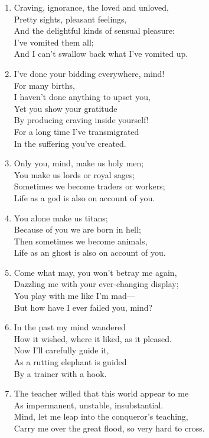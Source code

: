 \documentclass[10pt, openany]{book}
\begin{document}
\begin{enumerate}
\item Craving, ignorance, the loved and unloved,\\
Pretty sights, pleasant feelings,\\
And the delightful kinds of sensual pleasure: \\
I’ve vomited them all;\\
And I can’t swallow back what I’ve vomited up.

\item I’ve done your bidding everywhere, mind!\\
For many births, \\
I haven’t done anything to upset you,\\
Yet you show your gratitude \\
By producing craving inside yourself!\\
For a long time I’ve transmigrated \\
In the suffering you’ve created.

\item Only you, mind, make us holy men;\\
You make us lords or royal sages;\\
Sometimes we become traders or workers;\\
Life as a god is also on account of you.

\item You alone make us titans;\\
Because of you we are born in hell;\\
Then sometimes we become animals,\\
Life as an ghost is also on account of you.

\item Come what may, you won’t betray me again,\\
Dazzling me with your ever-changing display;\\
You play with me like I’m mad—\\
But how have I ever failed you, mind?

\item In the past my mind wandered\\
How it wished, where it liked, as it pleased.\\
Now I’ll carefully guide it,\\
As a rutting elephant is guided \\
By a trainer with a hook.

\item The teacher willed that this world appear to me\\
As impermanent, unstable, insubstantial.\\
Mind, let me leap into the conqueror’s teaching,\\
Carry me over the great flood, so very hard to cross.


\end{enumerate}
\end{document}
